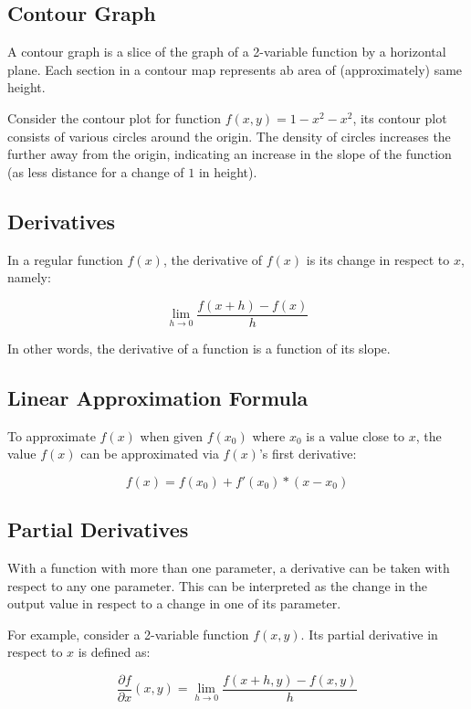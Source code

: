 \documentclass[12pt]{article}
\theoremstyle{definition}
\begin{document}
	\subsection{Contour Graph}
	
	A contour graph is a slice of the graph of a 2-variable function by a horizontal plane. Each section in a contour map represents ab area of (approximately) same height.
	
	Consider the contour plot for function $f(x, y) = 1 - x^2 - x^2$, its contour plot consists of various circles around the origin. The density of circles increases the further away from the origin, indicating an increase in the slope of the function (as less distance for a change of $1$ in height).
	
	\subsection{Derivatives}
	
	In a regular function $f(x)$, the derivative of $f(x)$ is its change in respect to $x$, namely:
	
	\begin{equation*}
		\lim_{h \to 0} \frac{f(x + h) - f(x)}{h}
	\end{equation*}
	
	In other words, the derivative of a function is a function of its slope.
	
	\subsection{Linear Approximation Formula}
	
	To approximate $f(x)$ when given $f(x_0)$ where $x_0$ is a value close to $x$, the value $f(x)$ can be approximated via $f(x)$'s first derivative:
	
	\begin{equation*}
		f(x) = f(x_0) + f'(x_0) * (x - x_0)
	\end{equation*}
	
	\subsection{Partial Derivatives}
	
	With a function with more than one parameter, a derivative can be taken with respect to any one parameter. This can be interpreted as the change in the output value in respect to a change in one of its parameter.
	
	For example, consider a 2-variable function $f(x, y)$. Its partial derivative in respect to $x$ is defined as:
	
	\begin{equation*}
		\frac{\partial f}{\partial x}(x, y) = \lim_{h \to 0} \frac{f(x + h, y) - f(x, y)}{h}
	\end{equation*}
		
\end{document}
